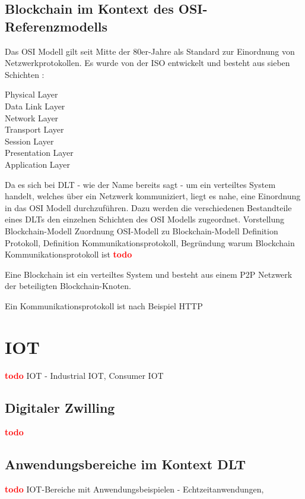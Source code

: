 \subsection{Blockchain im Kontext des OSI-Referenzmodells}
\label{subsec:fundamentals:dlt:osi}
Das \ac{OSI} Modell gilt seit Mitte der 80er-Jahre als Standard zur Einordnung von Netzwerkprotokollen. Es wurde von der \ac{ISO} entwickelt und besteht aus sieben Schichten \cite{OSI1980}:
\begin{description}
  \item[Physical Layer]
  \item[Data Link Layer]
  \item[Network Layer]
  \item[Transport Layer]
  \item[Session Layer]
  \item[Presentation Layer]
  \item[Application Layer]
\end{description}

Da es sich bei \ac{DLT} - wie der Name bereits sagt - um ein verteiltes System handelt, welches über ein Netzwerk kommuniziert, liegt es nahe, eine Einordnung in das \ac{OSI} Modell durchzuführen. Dazu werden die verschiedenen Bestandteile eines \ac{DLT}s den einzelnen Schichten des \ac{OSI} Modells zugeordnet.
  \cite{osi2014}
  Vorstellung Blockchain-Modell
  Zuordnung OSI-Modell zu Blockchain-Modell
  Definition Protokoll, Definition Kommunikationsprotokoll, Begründung warum Blockchain Kommunikationsprotokoll ist
  \textbf{\textcolor{red}{todo}}

Eine Blockchain ist ein verteiltes System und besteht aus einem \ac{P2P} Netzwerk der beteiligten Blockchain-Knoten.

Ein Kommunikationsprotokoll ist nach
Beispiel HTTP

%
%
\section{IOT}
\label{sec:fundamentals:iot}
\textbf{\textcolor{red}{todo}}
IOT - Industrial IOT, Consumer IOT


\subsection{Digitaler Zwilling}
\label{subsec:fundamentals:iot:digitaltwins}
\textbf{\textcolor{red}{todo}}


\subsection{Anwendungsbereiche im Kontext DLT}
\label{subsec:fundamentals:iot:usecases}
\textbf{\textcolor{red}{todo}}
IOT-Bereiche mit Anwendungsbeispielen - Echtzeitanwendungen,
